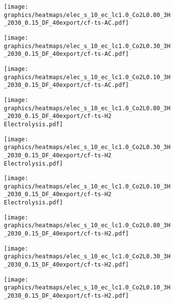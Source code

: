 \begin{figure}[h]
    \centering
        \begin{subfigure}[h]{0.33\textwidth}
            \centering
        \texttt{[image: graphics/heatmaps/elec\_s\_10\_ec\_lc1.0\_Co2L0.80\_3H\_2030\_0.15\_DF\_40export/cf-ts-AC.pdf]}
    \end{subfigure}
    \begin{subfigure}[h]{0.33\textwidth}
        \centering
        \texttt{[image: graphics/heatmaps/elec\_s\_10\_ec\_lc1.0\_Co2L0.30\_3H\_2030\_0.15\_DF\_40export/cf-ts-AC.pdf]}
    \end{subfigure}
    \begin{subfigure}[h]{0.33\textwidth}
        \centering
        \texttt{[image: graphics/heatmaps/elec\_s\_10\_ec\_lc1.0\_Co2L0.10\_3H\_2030\_0.15\_DF\_40export/cf-ts-AC.pdf]}
    \end{subfigure}


    \begin{subfigure}[h]{0.33\textwidth}
        \centering
        \texttt{[image: graphics/heatmaps/elec\_s\_10\_ec\_lc1.0\_Co2L0.80\_3H\_2030\_0.15\_DF\_40export/cf-ts-H2 Electrolysis.pdf]}
    \end{subfigure}
    \begin{subfigure}[h]{0.33\textwidth}
        \centering
        \texttt{[image: graphics/heatmaps/elec\_s\_10\_ec\_lc1.0\_Co2L0.30\_3H\_2030\_0.15\_DF\_40export/cf-ts-H2 Electrolysis.pdf]}
    \end{subfigure}
    \begin{subfigure}[h]{0.33\textwidth}
        \centering
        \texttt{[image: graphics/heatmaps/elec\_s\_10\_ec\_lc1.0\_Co2L0.10\_3H\_2030\_0.15\_DF\_40export/cf-ts-H2 Electrolysis.pdf]}
    \end{subfigure}

    \begin{subfigure}[h]{0.33\textwidth}
        \centering
        \texttt{[image: graphics/heatmaps/elec\_s\_10\_ec\_lc1.0\_Co2L0.80\_3H\_2030\_0.15\_DF\_40export/cf-ts-H2.pdf]}
    \end{subfigure}
    \begin{subfigure}[h]{0.33\textwidth}
        \centering
        \texttt{[image: graphics/heatmaps/elec\_s\_10\_ec\_lc1.0\_Co2L0.30\_3H\_2030\_0.15\_DF\_40export/cf-ts-H2.pdf]}
    \end{subfigure}
    \begin{subfigure}[h]{0.33\textwidth}
        \centering
        \texttt{[image: graphics/heatmaps/elec\_s\_10\_ec\_lc1.0\_Co2L0.10\_3H\_2030\_0.15\_DF\_40export/cf-ts-H2.pdf]}
        

\end{subfigure}
\end{figure}
